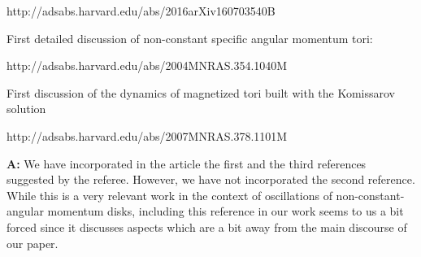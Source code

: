\documentclass{article}
\begin{document}
http://adsabs.harvard.edu/abs/2016arXiv160703540B


First detailed discussion of non-constant specific angular momentum tori:

http://adsabs.harvard.edu/abs/2004MNRAS.354.1040M

First discussion of the dynamics of magnetized tori built with the Komissarov solution

http://adsabs.harvard.edu/abs/2007MNRAS.378.1101M

\bigskip

{\bf A:} We have incorporated in the article the first and the third references 
suggested by the referee. However, we have not incorporated the second 
reference. While this is a very relevant work in the context of oscillations 
of non-constant-angular momentum disks, including this reference in our 
work seems to us a bit forced since it discusses aspects which are a bit 
away from the main discourse of our paper.


\begin{small}
\begin{thebibliography}{99}
%

%  
\end{thebibliography}

 \end{small}

 
\end{document}
